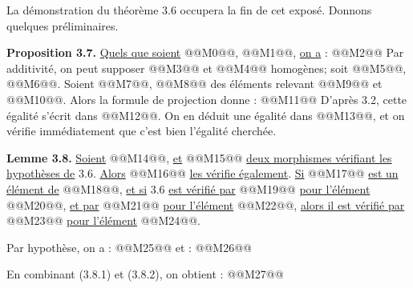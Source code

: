 
La démonstration du
théorème 3.6 occupera la fin de cet exposé. Donnons quelques préliminaires.

\textbf{Proposition 3.7.} \uline{Quels que soient} @@M0@@, @@M1@@, \uline{on a} :
@@M2@@
Par additivité, on peut supposer @@M3@@ et @@M4@@ homogènes; soit @@M5@@, @@M6@@.
Soient @@M7@@, @@M8@@ des éléments relevant @@M9@@ et @@M10@@. Alors la formule de projection donne :
@@M11@@
D'après 3.2, cette égalité s'écrit dans
@@M12@@. On en déduit une égalité dans
@@M13@@, et on vérifie immédiatement que c'est bien l'égalité cherchée.

\textbf{Lemme 3.8.} \uline{Soient} @@M14@@, \uline{et} @@M15@@ \uline{deux morphismes vérifiant les hypothèses de} 3.6. \uline{Alors} @@M16@@ \uline{les vérifie également}. \uline{Si} @@M17@@ \uline{est un élément de} @@M18@@, \uline{et si} 3.6 \uline{est vérifié par} @@M19@@ \uline{pour l'élément} @@M20@@, \uline{et par} @@M21@@ \uline{pour l'élément} @@M22@@, \uline{alors il est vérifié par} @@M23@@ \uline{pour l'élément} @@M24@@.

Par hypothèse, on a :
@@M25@@
et :
@@M26@@

En combinant (3.8.1) et (3.8.2), on obtient :
@@M27@@
